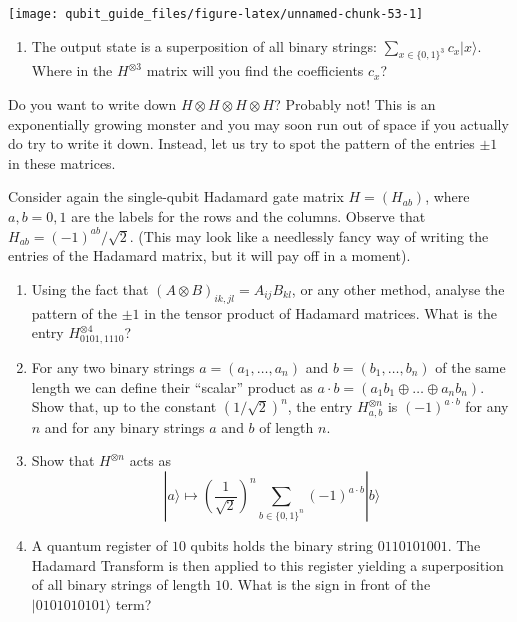 \documentclass[fleqn,a4paper]{article}
\providecommand{\tightlist}{\setlength{\itemsep}{0pt}\setlength{\parskip}{0pt}}
\theoremstyle{definition}
\theoremstyle{definition}
\theoremstyle{definition}
\theoremstyle{definition}
\theoremstyle{remark}
\begin{document}
\begin{center}\texttt{[image: qubit\_guide\_files/figure-latex/unnamed-chunk-53-1]} \end{center}

\begin{enumerate}
\def\labelenumi{\arabic{enumi}.}
\tightlist
\item
  The output state is a superposition of all binary strings: \(\sum_{x\in\{0,1\}^3} c_x|x\rangle\).
  Where in the \(H^{\otimes 3}\) matrix will you find the coefficients \(c_x\)?
\end{enumerate}

Do you want to write down \(H\otimes H\otimes H\otimes H\)?
Probably not!
This is an exponentially growing monster and you may soon run out of space if you actually do try to write it down.
Instead, let us try to spot the pattern of the entries \(\pm1\) in these matrices.

Consider again the single-qubit Hadamard gate matrix \(H=(H_{ab})\), where \(a,b=0,1\) are the labels for the rows and the columns.
Observe that \(H_{ab}=(-1)^{ab}/\sqrt{2}\).
(This may look like a needlessly fancy way of writing the entries of the Hadamard matrix, but it will pay off in a moment).

\begin{enumerate}
\def\labelenumi{\arabic{enumi}.}
\setcounter{enumi}{1}
\item
  Using the fact that \((A\otimes B)_{ik,jl} = A_{ij}B_{kl}\), or any other method, analyse the pattern of the \(\pm1\) in the tensor product of Hadamard matrices.
  What is the entry \(H^{\otimes 4}_{0101,1110}\)?
\item
  For any two binary strings \(a=(a_1,\ldots, a_n)\) and \(b =(b_1,\ldots , b_n)\) of the same length we can define their ``scalar'' product as \(a\cdot b = (a_1b_1\oplus \ldots \oplus a_n b_n)\).
  Show that, up to the constant \((1/\sqrt{2})^n\), the entry \(H^{\otimes n}_{a,b}\) is \((-1)^{a\cdot b}\) for any \(n\) and for any binary strings \(a\) and \(b\) of length \(n\).
\item
  Show that \(H^{\otimes n}\) acts as
  \[
   |a\rangle
   \longmapsto
   \left(\frac{1}{\sqrt{2}}\right)^n
   \sum_{b\in\{0,1\}^n} (-1)^{a\cdot b}|b\rangle
    \]
\item
  A quantum register of \(10\) qubits holds the binary string \(0110101001\).
  The Hadamard Transform is then applied to this register yielding a superposition of all binary strings of length \(10\).
  What is the sign in front of the \(|0101010101\rangle\) term?
\end{enumerate}
\end{document}
